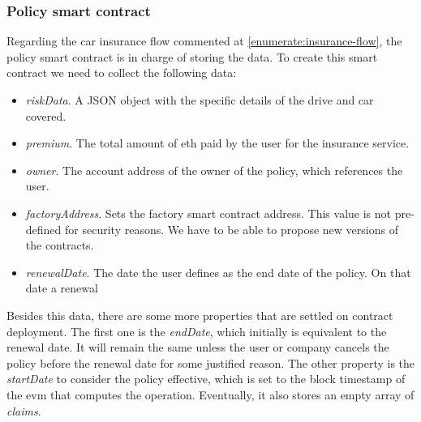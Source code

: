 \subsubsection{Policy smart contract}
\label{section:policy-smart-contract}
{

Regarding the car insurance flow commented at \ref{enumerate:insurance-flow}, the policy smart contract is in charge of storing the data. To create this smart contract we need to collect the following data:
\begin{itemize}
    \item \textit{riskData}. A JSON object with the specific details of the drive and car covered.
    \item \textit{premium}. The total amount of \acrshort{eth} paid by the user for the insurance service.
    \item \textit{owner}. The account address of the owner of the policy, which references the user.
    \item \textit{factoryAddress}. Sets the factory smart contract address. This value is not pre-defined for security reasons. We have to be able to propose new versions of the contracts.
    \item \textit{renewalDate}. The date the user defines as the end date of the policy. On that date a renewal
\end{itemize}

Besides this data, there are some more properties that are settled on contract deployment. The first one is the \textit{endDate}, which initially is equivalent to the renewal date. It will remain the same unless the user or company cancels the policy before the renewal date for some justified reason. The other property is the \textit{startDate} to consider the policy effective, which is set to the block timestamp of the \acrshort{evm} that computes the operation. Eventually, it also stores an empty array of \textit{claims}.

}
